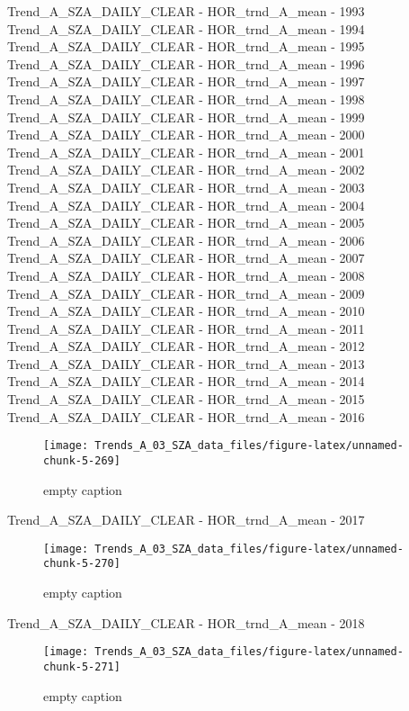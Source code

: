 \documentclass[
  10pt,
  a4paper,oneside]{article}
\begin{document}
Trend\_A\_SZA\_DAILY\_CLEAR - HOR\_trnd\_A\_mean - 1993
Trend\_A\_SZA\_DAILY\_CLEAR - HOR\_trnd\_A\_mean - 1994
Trend\_A\_SZA\_DAILY\_CLEAR - HOR\_trnd\_A\_mean - 1995
Trend\_A\_SZA\_DAILY\_CLEAR - HOR\_trnd\_A\_mean - 1996
Trend\_A\_SZA\_DAILY\_CLEAR - HOR\_trnd\_A\_mean - 1997
Trend\_A\_SZA\_DAILY\_CLEAR - HOR\_trnd\_A\_mean - 1998
Trend\_A\_SZA\_DAILY\_CLEAR - HOR\_trnd\_A\_mean - 1999
Trend\_A\_SZA\_DAILY\_CLEAR - HOR\_trnd\_A\_mean - 2000
Trend\_A\_SZA\_DAILY\_CLEAR - HOR\_trnd\_A\_mean - 2001
Trend\_A\_SZA\_DAILY\_CLEAR - HOR\_trnd\_A\_mean - 2002
Trend\_A\_SZA\_DAILY\_CLEAR - HOR\_trnd\_A\_mean - 2003
Trend\_A\_SZA\_DAILY\_CLEAR - HOR\_trnd\_A\_mean - 2004
Trend\_A\_SZA\_DAILY\_CLEAR - HOR\_trnd\_A\_mean - 2005
Trend\_A\_SZA\_DAILY\_CLEAR - HOR\_trnd\_A\_mean - 2006
Trend\_A\_SZA\_DAILY\_CLEAR - HOR\_trnd\_A\_mean - 2007
Trend\_A\_SZA\_DAILY\_CLEAR - HOR\_trnd\_A\_mean - 2008
Trend\_A\_SZA\_DAILY\_CLEAR - HOR\_trnd\_A\_mean - 2009
Trend\_A\_SZA\_DAILY\_CLEAR - HOR\_trnd\_A\_mean - 2010
Trend\_A\_SZA\_DAILY\_CLEAR - HOR\_trnd\_A\_mean - 2011
Trend\_A\_SZA\_DAILY\_CLEAR - HOR\_trnd\_A\_mean - 2012
Trend\_A\_SZA\_DAILY\_CLEAR - HOR\_trnd\_A\_mean - 2013
Trend\_A\_SZA\_DAILY\_CLEAR - HOR\_trnd\_A\_mean - 2014
Trend\_A\_SZA\_DAILY\_CLEAR - HOR\_trnd\_A\_mean - 2015
Trend\_A\_SZA\_DAILY\_CLEAR - HOR\_trnd\_A\_mean - 2016

\begin{figure}[!ht]

{\centering \texttt{[image: Trends\_A\_03\_SZA\_data\_files/figure-latex/unnamed-chunk-5-269]} 

}

\caption{ empty caption }\label{fig:unnamed-chunk-5-269}
\end{figure}

Trend\_A\_SZA\_DAILY\_CLEAR - HOR\_trnd\_A\_mean - 2017

\begin{figure}[!ht]

{\centering \texttt{[image: Trends\_A\_03\_SZA\_data\_files/figure-latex/unnamed-chunk-5-270]} 

}

\caption{ empty caption }\label{fig:unnamed-chunk-5-270}
\end{figure}

Trend\_A\_SZA\_DAILY\_CLEAR - HOR\_trnd\_A\_mean - 2018

\begin{figure}[!ht]

{\centering \texttt{[image: Trends\_A\_03\_SZA\_data\_files/figure-latex/unnamed-chunk-5-271]} 

}

\caption{ empty caption }\label{fig:unnamed-chunk-5-271}
\end{figure}
\end{document}

